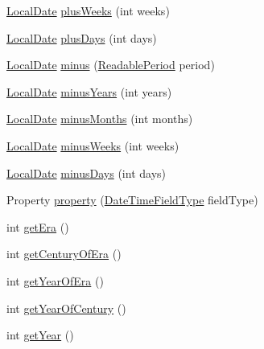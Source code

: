 \begin{DoxyCompactItemize}
\item 
\hyperlink{classorg_1_1joda_1_1time_1_1_local_date}{Local\-Date} \hyperlink{classorg_1_1joda_1_1time_1_1_local_date_a7fdf897acb1b7b58813f0bf3b8eb4de8}{plus\-Weeks} (int weeks)
\item 
\hyperlink{classorg_1_1joda_1_1time_1_1_local_date}{Local\-Date} \hyperlink{classorg_1_1joda_1_1time_1_1_local_date_a997ddf97ed631d5fe91f0f0ad6fd390a}{plus\-Days} (int days)
\item 
\hyperlink{classorg_1_1joda_1_1time_1_1_local_date}{Local\-Date} \hyperlink{classorg_1_1joda_1_1time_1_1_local_date_a992eb3826f0cc6146ab100ca7a19e598}{minus} (\hyperlink{interfaceorg_1_1joda_1_1time_1_1_readable_period}{Readable\-Period} period)
\item 
\hyperlink{classorg_1_1joda_1_1time_1_1_local_date}{Local\-Date} \hyperlink{classorg_1_1joda_1_1time_1_1_local_date_a29826ab36946f848ced8c820bf3428a2}{minus\-Years} (int years)
\item 
\hyperlink{classorg_1_1joda_1_1time_1_1_local_date}{Local\-Date} \hyperlink{classorg_1_1joda_1_1time_1_1_local_date_ad9a4cf42c52b01036b95bf7f224d8ca7}{minus\-Months} (int months)
\item 
\hyperlink{classorg_1_1joda_1_1time_1_1_local_date}{Local\-Date} \hyperlink{classorg_1_1joda_1_1time_1_1_local_date_adaf25ebdbac0c0b94b2e4264aa04e508}{minus\-Weeks} (int weeks)
\item 
\hyperlink{classorg_1_1joda_1_1time_1_1_local_date}{Local\-Date} \hyperlink{classorg_1_1joda_1_1time_1_1_local_date_a0b2631c265d9cdccfb130c92d4bdfcd0}{minus\-Days} (int days)
\item 
Property \hyperlink{classorg_1_1joda_1_1time_1_1_local_date_a096095fd8c6c242aaa5f7c51661c6f46}{property} (\hyperlink{classorg_1_1joda_1_1time_1_1_date_time_field_type}{Date\-Time\-Field\-Type} field\-Type)
\item 
int \hyperlink{classorg_1_1joda_1_1time_1_1_local_date_a23c899102749ff1e4e9d4afa16914e9c}{get\-Era} ()
\item 
int \hyperlink{classorg_1_1joda_1_1time_1_1_local_date_adacfcae0c482e1c458e8125f7b0826e0}{get\-Century\-Of\-Era} ()
\item 
int \hyperlink{classorg_1_1joda_1_1time_1_1_local_date_ad44bd895caacefa71ad052e4c140ab70}{get\-Year\-Of\-Era} ()
\item 
int \hyperlink{classorg_1_1joda_1_1time_1_1_local_date_acbf7679285874924243fa0b7148db243}{get\-Year\-Of\-Century} ()
\item 
int \hyperlink{classorg_1_1joda_1_1time_1_1_local_date_a3cd9b9d55e0c5cae4ec725d467bbb838}{get\-Year} ()

\end{DoxyCompactItemize}
